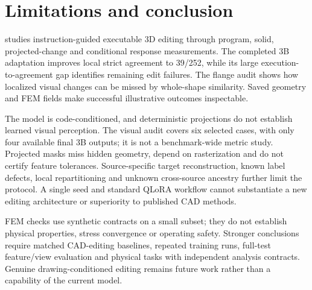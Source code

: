 \section{Limitations and conclusion}
\label{sec:conclusion}
\ours studies instruction-guided executable 3D editing through program, solid, projected-change and conditional response measurements. The completed 3B adaptation improves local strict agreement to 39/252, while its large execution-to-agreement gap identifies remaining edit failures. The flange audit shows how localized visual changes can be missed by whole-shape similarity. Saved geometry and FEM fields make successful illustrative outcomes inspectable.

The model is code-conditioned, and deterministic projections do not establish learned visual perception. The visual audit covers six selected cases, with only four available final 3B outputs; it is not a benchmark-wide metric study. Projected masks miss hidden geometry, depend on rasterization and do not certify feature tolerances. Source-specific target reconstruction, known label defects, local repartitioning and unknown cross-source ancestry further limit the protocol. A single seed and standard QLoRA workflow cannot substantiate a new editing architecture or superiority to published CAD methods.

FEM checks use synthetic contracts on a small subset; they do not establish physical properties, stress convergence or operating safety. Stronger conclusions require matched CAD-editing baselines, repeated training runs, full-test feature/view evaluation and physical tasks with independent analysis contracts. Genuine drawing-conditioned editing remains future work rather than a capability of the current model.
